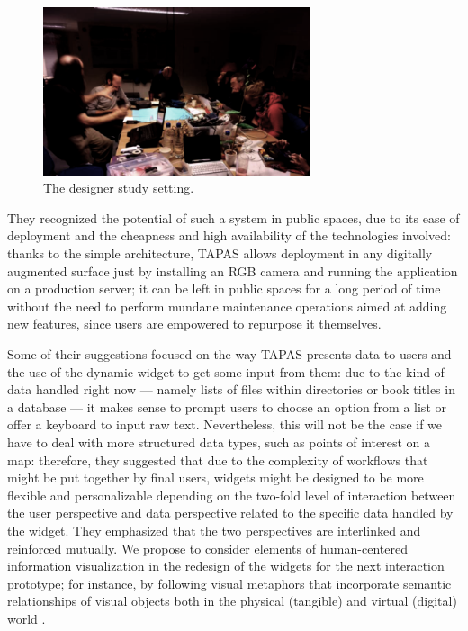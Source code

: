 \begin{figure}[ht!]
\centering
\includegraphics[width=0.7\textwidth]{images/c4/tiree.png}
\caption{The designer study setting.}\label{fig:des}
\end{figure}

They recognized the potential of such a system in public spaces, due to its ease of deployment and the cheapness and high availability of the technologies involved: thanks to the simple architecture, \acs{TAPAS} allows deployment in any digitally augmented surface just by installing an RGB camera and running the application on a production server; it can be left in public spaces for a long period of time without the need to perform mundane maintenance operations aimed at adding new features, since users are empowered to repurpose it themselves.

Some of their suggestions focused on the way \acs{TAPAS} presents data to users and the use of the dynamic widget to get some input from them: due to the kind of data handled right now --- namely lists of files within directories or book titles in a database --- it makes sense to prompt users to choose an option from a list or offer a keyboard to input raw text. Nevertheless, this will not be the case if we have to deal with more structured data types, such as points of interest on a map: therefore, they suggested that due to the complexity of workflows that might be put together by final users, widgets might be designed to be more flexible and personalizable depending on the two-fold level of interaction between the user perspective and data perspective related to the specific data handled by the widget. They emphasized that the two perspectives are interlinked and reinforced mutually. We propose to consider elements of human-centered information visualization in the redesign of the widgets for the next interaction prototype; for instance, by following visual metaphors that incorporate semantic relationships of visual objects both in the physical (tangible) and virtual (digital) world \cite{Majumder:2013wt,Bigelow:2014th}.

